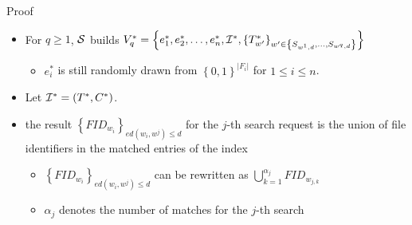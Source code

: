 \documentclass{beamer}
\begin{document}
\begin{frame}{Proof}
	\begin{itemize}
		\item 	For $q \ge 1$, $\cal S$ builds $V_q^* = \left\{ {e_1^*,e_2^*, \ldots ,e_n^*,{{\cal I}^*},{{\left\{ {T_{w'}^*} \right\}}_{w' \in \left\{ {{S_{{w^1},d}}, \ldots ,{S_{{w^q},d}}} \right\}}}} \right\}$
				\begin{itemize}
					\item $e_i^*$ is still randomly drawn from ${\left\{ {0,1} \right\}^{\left| {{F_i}} \right|}}$ for $1 \le i \le n$.
				\end{itemize}
		\item Let ${{\cal I}^*} = ({T^*},{C^*})$.
        \item the result ${\left\{ {FI{D_{{w_i}}}} \right\}_{ed({w_i},{w^j}) \le d}}$ for the $j$-th search request is the union of file identifiers in the matched entries of the index
		\begin{itemize}
			\item ${\left\{ {FI{D_{{w_i}}}} \right\}_{ed({w_i},{w^j}) \le d}}$ can be rewritten as $\bigcup\nolimits_{k = 1}^{{\alpha _j}} {FI{D_{{w_{j,k}}}}} $
			\item ${\alpha _j}$ denotes the number of matches for the $j$-th search
		\end{itemize}
	\end{itemize}
\end{frame}
\end{document}
